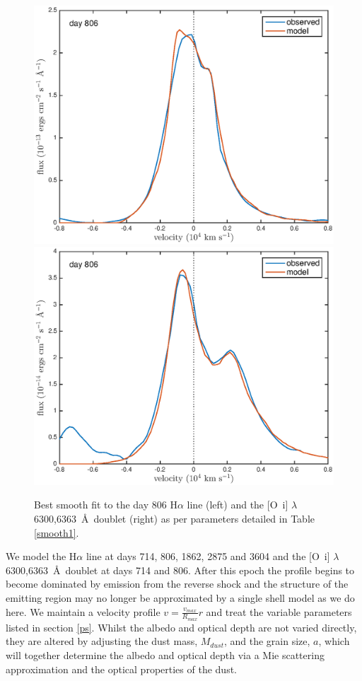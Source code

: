 \documentclass[useAMS,usenatbib,usegraphicx]{mnras}
\begin{document}
\begin{figure}
\begin{center}
\includegraphics[trim =37 10 45 15,clip=true,scale=0.51]{smooth/best_fit/d806Ha}
\includegraphics[trim =37 10 45 15,clip=true,scale=0.51]{smooth/best_fit/d806OI}
\caption{Best smooth fit to the day 806 H$\alpha$ line (left) and the 
[O~{\sc i}] $\lambda$6300,6363~\AA\ doublet (right) as per parameters 
detailed in Table \ref{smooth1}.}
\label{d806bf}
\end{center}
\end{figure}


We model the H$\alpha$ line at days 714, 806, 1862, 2875 and 3604 and the 
[O~{\sc i}] $\lambda$6300,6363~\AA\ doublet at days 714 and 806. After this 
epoch the profile begins to become dominated by emission from the reverse shock 
and the structure of the emitting region may no longer be approximated by 
a single shell model as we do here.  We maintain a velocity profile $v = 
\frac{v_{max}}{R_{max}}r$ and treat the variable parameters listed in 
section \ref{ps}.  Whilst the albedo and optical depth are not varied 
directly, they are altered by adjusting the dust mass, $M_{dust}$, and the 
grain size, $a$, which will together determine the albedo and optical 
depth via a Mie scattering approximation and the optical properties of the 
dust.
\end{document}
